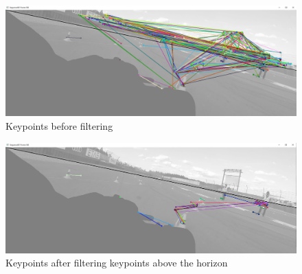 \begin{figure}
    \centering
    \includegraphics[width=1\textwidth]{figures/keypoint_orig.png}
    \caption{Keypoints before filtering}
    \label{fig:key_orig}
\end{figure}
\begin{figure}
    \centering
    \includegraphics[width=1\textwidth]{figures/keypoint_filtered.png}
    \caption{Keypoints after filtering keypoints above the horizon}
    \label{fig:key_filtered}
\end{figure}